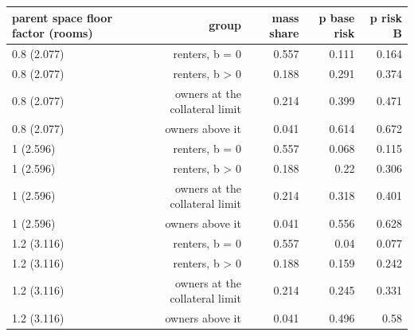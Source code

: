 \begin{tabular}{lrrrr}
\toprule
parent space floor factor (rooms) & group & mass share & p base risk & p risk B \\
\midrule
0.8 (2.077) & renters, b = 0 & 0.557 & 0.111 & 0.164 \\
0.8 (2.077) & renters, b > 0 & 0.188 & 0.291 & 0.374 \\
0.8 (2.077) & owners at the collateral limit & 0.214 & 0.399 & 0.471 \\
0.8 (2.077) & owners above it & 0.041 & 0.614 & 0.672 \\
1 (2.596) & renters, b = 0 & 0.557 & 0.068 & 0.115 \\
1 (2.596) & renters, b > 0 & 0.188 & 0.22 & 0.306 \\
1 (2.596) & owners at the collateral limit & 0.214 & 0.318 & 0.401 \\
1 (2.596) & owners above it & 0.041 & 0.556 & 0.628 \\
1.2 (3.116) & renters, b = 0 & 0.557 & 0.04 & 0.077 \\
1.2 (3.116) & renters, b > 0 & 0.188 & 0.159 & 0.242 \\
1.2 (3.116) & owners at the collateral limit & 0.214 & 0.245 & 0.331 \\
1.2 (3.116) & owners above it & 0.041 & 0.496 & 0.58 \\
\bottomrule
\end{tabular}
